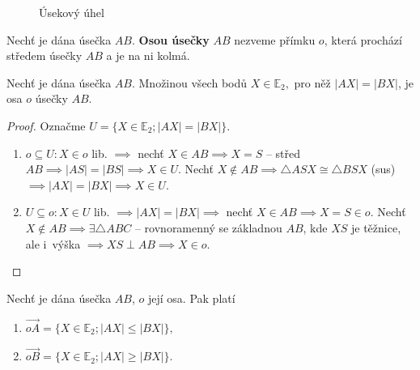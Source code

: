 \begin{figure}[ht!]
  \caption{Úsekový úhel}
\end{figure}

\begin{definition}
  Nechť je dána úsečka $AB$. \textbf{Osou úsečky} $AB$ nezveme přímku $o$, která prochází středem úsečky $AB$ a je na ni kolmá.
\end{definition}

\begin{veta}\label{mbdv}
  Nechť je dána úsečka $AB$. Množinou všech bodů $X\in \mathbb E_2,$ pro něž $|AX|=|BX|$, je osa $o$ úsečky $AB$.
\end{veta}

\begin{proof}
  Označme $U=\{ X\in \mathbb E_2; |AX|=|BX| \}$.
  \begin{enumerate}[$i.$]
    \item $o \subseteq U\colon X \in o$ lib. $\implies$ nechť $X\in AB \implies X=S$ -- střed $AB \implies |AS|=|BS| \implies X \in U.$ Nechť $X \notin AB \implies \triangle ASX \cong \triangle BSX$ (sus) $\implies |AX|=|BX| \implies X \in U$.
    \item $U \subseteq o\colon X \in U$ lib. $\implies |AX|=|BX| \implies$ nechť $X \in AB \implies X=S \in o.$ Nechť $X \notin AB \implies \exists \triangle ABC$ -- rovnoramenný se základnou $AB$, kde $XS$ je těžnice, ale i~výška $\implies XS \perp AB \implies X \in o.$ \qedhere
  \end{enumerate}
\end{proof}

\begin{veta}
  Nechť je dána úsečka $AB$, $o$ její osa. Pak platí
  \begin{enumerate}[$i.$]
    \item $\overrightarrow{oA}=\{ X\in \mathbb E_2; |AX|\leq |BX| \},$
    \item $\overrightarrow{oB}=\{ X \in \mathbb E_2; |AX| \geq |BX| \}.$
  \end{enumerate}
\end{veta}


